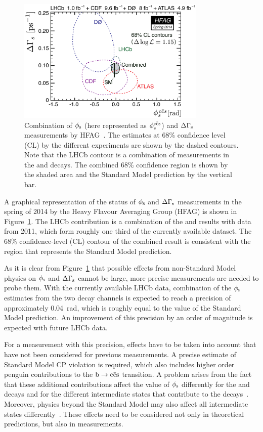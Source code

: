 \begin{figure}[tb]
  \centering
  \includegraphics[width=0.8\textwidth]{graphics/intro/hfag_spr2014_DGsphis_comb-crop-cmyk}
  \caption{Combination of $\phi_\text{s}$ (here represented as $\phisccs$) and $\Delta\Gamma_\text{s}$ measurements by HFAG~\cite{Amhis:2012bh}.
           The estimates at 68\% confidence level (CL) by the different experiments are shown by the dashed contours.
           Note that the LHCb contour is a combination of measurements in the \BstoJpsiphi{} and \BstoJpsipipi{} decays.
           The combined 68\% confidence region is shown by the shaded area and the Standard Model prediction by the vertical bar.}
  \label{fig:phisDGs}
\end{figure}
A graphical representation of the status of $\phi_\text{s}$ and $\Delta\Gamma_\text{s}$ measurements in the spring of 2014 by the Heavy Flavour Averaging Group
(HFAG) is shown in Figure~\ref{fig:phisDGs}. The LHCb contribution is a combination of the \BstoJpsiphi{} and \BstoJpsipipi{} results with
data from 2011, which form roughly one third of the currently available dataset. The 68\% confidence-level (CL) contour of the combined
result is consistent with the region that represents the Standard Model prediction.

As it is clear from Figure~\ref{fig:phisDGs} that possible effects from non-Standard Model physics on $\phi_\text{s}$ and $\Delta\Gamma_\text{s}$ cannot be large,
more precise measurements are needed to probe them. With the currently available LHCb data, combination of the $\phi_\text{s}$ estimates from the
two decay channels is expected to reach a precision of approximately 0.04~rad, which is roughly equal to the value of the Standard Model
prediction. An improvement of this precision by an order of magnitude is expected with future LHCb data.

For a measurement with this precision, effects have to be taken into account that have not been considered for previous measurements. A
precise estimate of Standard Model CP violation is required, which also includes higher order penguin contributions to the $\btoccs$
transition. A problem arises from the fact that these additional contributions affect the value of $\phi_\text{s}$ differently for the
\BstoJpsiphi{} and \BstoJpsipipi{} decays and for the different intermediate states that contribute to the
decays~\cite{Faller:2008gt,*Bhattacharya:2012ph}. Moreover, physics beyond the Standard Model may also affect all intermediate states
differently~\cite{Chiang:2009ev,*Datta:2009fk}. These effects need to be considered not only in theoretical predictions, but also in
measurements.

